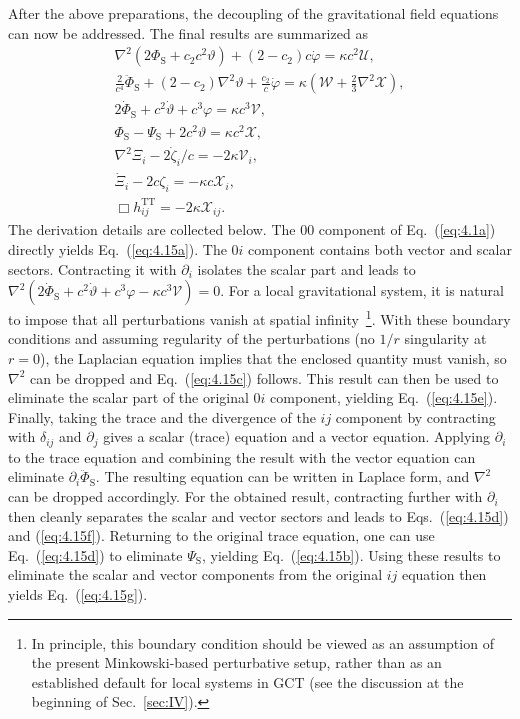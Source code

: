 \documentclass[aps,prd,twocolumn]{revtex4-2}
\newcommand\p{\partial}
\begin{document}
After the above preparations, the decoupling of the gravitational field equations can now be addressed. The final results are summarized as 
\begin{subequations}\label{eq:4.15}
\begin{gather}
  \nabla^2 (2\Phi_\mathrm{S} + c_2c^2\vartheta) + (2-c_2)c\dot{\varphi} = \kappa c^2\mathcal{U}, \label{eq:4.15a}\\
  \frac{2}{c^4}\ddot{\Phi}_\mathrm{S} + (2-c_2)\nabla^2\vartheta +\frac{c_2}{c}\dot{\varphi} = \kappa(\mathcal{W} + \frac{2}{3}\nabla^2\mathcal{X}), \label{eq:4.15b}\\
  2\dot{\Phi}_\mathrm{S} + c^2\dot{\vartheta} + c^3\varphi = \kappa c^3\mathcal{V}, \label{eq:4.15c}\\
  \Phi_\mathrm{S}-\Psi_\mathrm{S} + 2c^2\vartheta = \kappa c^2\mathcal{X}, \label{eq:4.15d}\\
  \nabla^2\Xi_i - 2\dot{\zeta}_i/c = -2\kappa\mathcal{V}_i, \label{eq:4.15e}\\
  \dot{\Xi}_i - 2c\zeta_i = - \kappa c\mathcal{X}_i, \label{eq:4.15f}\\
  \Box h_{ij}^\mathrm{TT} = - 2\kappa\mathcal{X}_{ij}. \label{eq:4.15g}
\end{gather}
\end{subequations}
The derivation details are collected below. The $00$ component of Eq.~(\ref{eq:4.1a}) directly yields Eq.~(\ref{eq:4.15a}). The $0i$ component contains both vector and scalar sectors. Contracting it with $\p_i$ isolates the scalar part and leads to $\nabla^2(2\dot{\Phi}_\mathrm{S} + c^2\dot{\vartheta} + c^3\varphi - \kappa c^3\mathcal{V})=0$. For a local gravitational system, it is natural to impose that all perturbations vanish at spatial infinity~\footnote{In principle, this boundary condition should be viewed as an assumption of the present Minkowski-based perturbative setup, rather than as an established default for local systems in GCT (see the discussion at the beginning of Sec.~\ref{sec:IV}).}. With these boundary conditions and assuming regularity of the perturbations (no $1/r$ singularity at $r=0$), the Laplacian equation implies that the enclosed quantity must vanish, so $\nabla^2$ can be dropped and Eq.~(\ref{eq:4.15c}) follows. This result can then be used to eliminate the scalar part of the original $0i$ component, yielding Eq.~(\ref{eq:4.15e}). Finally, taking the trace and the divergence of the $ij$ component by contracting with $\delta_{ij}$ and $\p_j$ gives a scalar (trace) equation and a vector equation. Applying $\p_i$ to the trace equation and combining the result with the vector equation can eliminate $\p_i\ddot{\Phi}_\mathrm{S}$. The resulting equation can be written in Laplace form, and $\nabla^2$ can be dropped accordingly. For the obtained result, contracting further with $\p_i$ then cleanly separates the scalar and vector sectors and leads to Eqs.~(\ref{eq:4.15d}) and (\ref{eq:4.15f}). Returning to the original trace equation, one can use Eq.~(\ref{eq:4.15d}) to eliminate $\Psi_\mathrm{S}$, yielding Eq.~(\ref{eq:4.15b}). Using these results to eliminate the scalar and vector components from the original $ij$ equation then yields Eq.~(\ref{eq:4.15g}).
\end{document}
